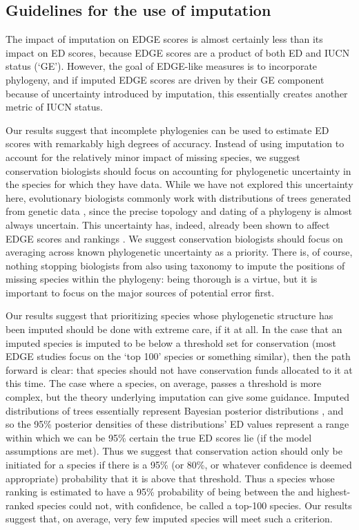 \documentclass[12pt,english]{article}
\begin{document}
\subsection*{Guidelines for the use of imputation}
The impact of imputation on EDGE scores is almost certainly less than its impact
on ED scores, because EDGE scores are a product of both ED and IUCN status
(‘GE'). However, the goal of EDGE-like measures is to incorporate phylogeny, and
if imputed EDGE scores are driven by their GE component because of uncertainty
introduced by imputation, this essentially creates another metric of IUCN
status.

Our results suggest that incomplete phylogenies can be used to estimate ED
scores with remarkably high degrees of accuracy. Instead of using imputation to
account for the relatively minor impact of missing species, we suggest
conservation biologists should focus on accounting for phylogenetic uncertainty
in the species for which they have data. While we have not explored this
uncertainty here, evolutionary biologists commonly work with distributions of
trees generated from genetic data \autocite[reviewed in][]{Huelsenbeck2001,
Bollback2005}, since the precise topology and dating of a phylogeny is almost
always uncertain. This uncertainty has, indeed, already been shown to affect
EDGE scores and rankings \autocite{Pearse2015}. We suggest conservation
biologists should focus on averaging across known phylogenetic uncertainty as a
priority. There is, of course, nothing stopping biologists from also using
taxonomy to impute the positions of missing species within the phylogeny: being
thorough is a virtue, but it is important to focus on the major sources of
potential error first.

Our results suggest that prioritizing species whose phylogenetic
structure has been imputed should be done with extreme care, if it at all. In
the case that an imputed species is imputed to be below a threshold set for
conservation (most EDGE studies focus on the ‘top 100' species or something
similar), then the path forward is clear: that species should not have
conservation funds allocated to it at this time. The case where a species, on
average, passes a threshold is more complex, but the theory underlying
imputation can give some guidance. Imputed distributions of trees essentially
represent Bayesian posterior distributions \autocite{Kuhn2011}, and
so the 95\% posterior densities of these distributions' ED values represent a
range within which we can be 95\% certain the true ED scores lie (if the model
assumptions are met). Thus we suggest that conservation action should only be
initiated for a species if there is a 95\% (or 80\%, or whatever confidence is
deemed appropriate) probability that it is above that threshold. Thus a species
whose ranking is estimated to have a 95\% probability of being between the  and  highest-ranked species could not, with confidence, be called a top-100
species. Our results suggest that, on average, very few imputed species will
meet such a criterion.
\end{document}
